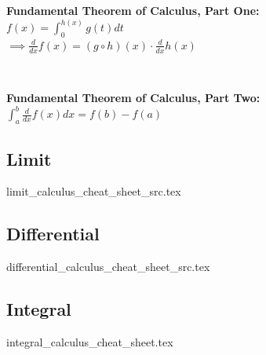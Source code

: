 
\begin{minipage}{\textwidth}
    \textbf{Fundamental Theorem of Calculus, Part One:}
    \\ \( f( x ) = \displaystyle\int_{0}^{h( x )} { g( t ) dt } \)
    \\ \( \implies \displaystyle\frac{ d }{ dx } f( x ) = ( g \circ h )( x ) \cdot \displaystyle\frac{ d }{ dx } h( x ) \)
\end{minipage}
\\ \begin{minipage}{\textwidth}
    \textbf{Fundamental Theorem of Calculus, Part Two:}
    \\ \( \displaystyle\int_{a}^{b} { \displaystyle\frac{ d }{ dx } f( x ) dx } = f( b ) - f( a ) \)
\end{minipage}

\subsection*{Limit}
{limit_calculus_cheat_sheet_src.tex}

\subsection*{Differential}
{differential_calculus_cheat_sheet_src.tex}

\subsection*{Integral}
{integral_calculus_cheat_sheet.tex}

